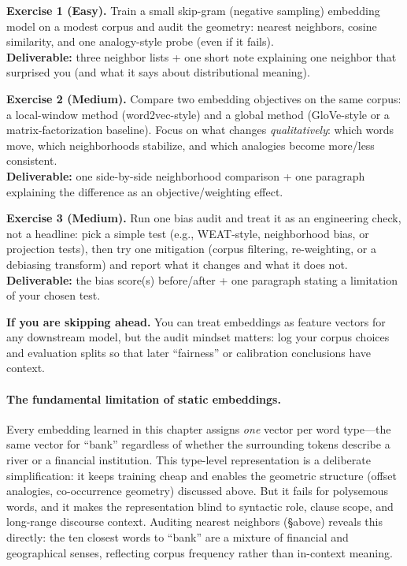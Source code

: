 \begin{tcolorbox}[summarybox, title={Exercises}]
\textbf{Exercise 1 (Easy).} Train a small skip\hyp{}gram (negative sampling) embedding model on a modest corpus and audit the geometry: nearest neighbors, cosine similarity, and one analogy-style probe (even if it fails). \\
\textbf{Deliverable:} three neighbor lists + one short note explaining one neighbor that surprised you (and what it says about distributional meaning).

\smallskip
\textbf{Exercise 2 (Medium).} Compare two embedding objectives on the same corpus: a local-window method (word2vec-style) and a global method (GloVe-style or a matrix-factorization baseline). Focus on what changes \emph{qualitatively}: which words move, which neighborhoods stabilize, and which analogies become more/less consistent. \\
\textbf{Deliverable:} one side-by-side neighborhood comparison + one paragraph explaining the difference as an objective/weighting effect.

\smallskip
\textbf{Exercise 3 (Medium).} Run one bias audit and treat it as an engineering check, not a headline: pick a simple test (e.g., WEAT-style, neighborhood bias, or projection tests), then try one mitigation (corpus filtering, re-weighting, or a debiasing transform) and report what it changes and what it does not. \\
\textbf{Deliverable:} the bias score(s) before/after + one paragraph stating a limitation of your chosen test.

\par\medskip
\noindent\textbf{If you are skipping ahead.} You can treat embeddings as feature vectors for any downstream model, but the audit mindset matters: log your corpus choices and evaluation splits so that later ``fairness'' or calibration conclusions have context.
\end{tcolorbox}

\medskip
\paragraph{The fundamental limitation of static embeddings.}
Every embedding learned in this chapter assigns \emph{one} vector per word type---the same vector for ``bank'' regardless of whether the surrounding tokens describe a river or a financial institution. This type-level representation is a deliberate simplification: it keeps training cheap and enables the geometric structure (offset analogies, co-occurrence geometry) discussed above. But it fails for polysemous words, and it makes the representation blind to syntactic role, clause scope, and long-range discourse context. Auditing nearest neighbors (\S above) reveals this directly: the ten closest words to ``bank'' are a mixture of financial and geographical senses, reflecting corpus frequency rather than in-context meaning.

